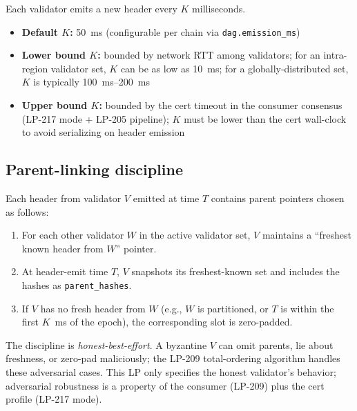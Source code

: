 Each validator emits a new header every $K$ milliseconds.

\begin{itemize}[leftmargin=2em,nosep]
\item \textbf{Default $K$:} \SI{50}{\milli\second} (configurable per
  chain via \texttt{dag.emission\_ms})
\item \textbf{Lower bound $K$:} bounded by network RTT among
  validators; for an intra-region validator set, $K$ can be as low
  as \SI{10}{\milli\second}; for a globally-distributed set, $K$ is
  typically \SI{100}{\milli\second}--\SI{200}{\milli\second}
\item \textbf{Upper bound $K$:} bounded by the cert timeout in the
  consumer consensus (LP-217 mode + LP-205 pipeline); $K$ must be
  lower than the cert wall-clock to avoid serializing on header
  emission
\end{itemize}

\subsection{Parent-linking discipline}

Each header from validator $V$ emitted at time $T$ contains parent
pointers chosen as follows:

\begin{enumerate}[leftmargin=2em,nosep]
\item For each other validator $W$ in the active validator set, $V$
  maintains a ``freshest known header from $W$'' pointer.
\item At header-emit time $T$, $V$ snapshots its freshest-known set
  and includes the hashes as \texttt{parent\_hashes}.
\item If $V$ has no fresh header from $W$ (e.g., $W$ is partitioned,
  or $T$ is within the first $K$~ms of the epoch), the
  corresponding slot is zero-padded.
\end{enumerate}

The discipline is \emph{honest-best-effort}. A byzantine $V$ can
omit parents, lie about freshness, or zero-pad maliciously; the
LP-209 total-ordering algorithm handles these adversarial cases.
This LP only specifies the honest validator's behavior;
adversarial robustness is a property of the consumer (LP-209) plus
the cert profile (LP-217 mode).
